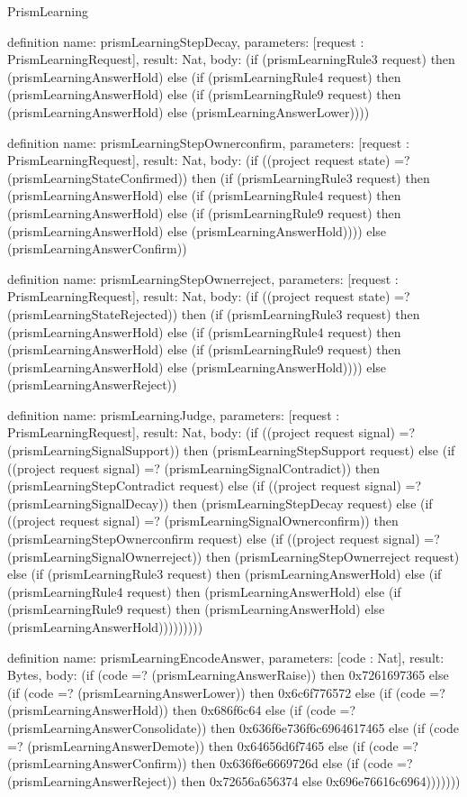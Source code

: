 \begin{lexlean}{PrismLearning}
\begin{semanticmodule}
definition{
  name: prismLearningStepDecay,
  parameters: [request : PrismLearningRequest],
  result: Nat,
  body: (if (prismLearningRule3 request) then (prismLearningAnswerHold) else (if (prismLearningRule4 request) then (prismLearningAnswerHold) else (if (prismLearningRule9 request) then (prismLearningAnswerHold) else (prismLearningAnswerLower))))
}

definition{
  name: prismLearningStepOwnerconfirm,
  parameters: [request : PrismLearningRequest],
  result: Nat,
  body: (if ((project request state) =? (prismLearningStateConfirmed)) then (if (prismLearningRule3 request) then (prismLearningAnswerHold) else (if (prismLearningRule4 request) then (prismLearningAnswerHold) else (if (prismLearningRule9 request) then (prismLearningAnswerHold) else (prismLearningAnswerHold)))) else (prismLearningAnswerConfirm))
}

definition{
  name: prismLearningStepOwnerreject,
  parameters: [request : PrismLearningRequest],
  result: Nat,
  body: (if ((project request state) =? (prismLearningStateRejected)) then (if (prismLearningRule3 request) then (prismLearningAnswerHold) else (if (prismLearningRule4 request) then (prismLearningAnswerHold) else (if (prismLearningRule9 request) then (prismLearningAnswerHold) else (prismLearningAnswerHold)))) else (prismLearningAnswerReject))
}

definition{
  name: prismLearningJudge,
  parameters: [request : PrismLearningRequest],
  result: Nat,
  body: (if ((project request signal) =? (prismLearningSignalSupport)) then (prismLearningStepSupport request) else (if ((project request signal) =? (prismLearningSignalContradict)) then (prismLearningStepContradict request) else (if ((project request signal) =? (prismLearningSignalDecay)) then (prismLearningStepDecay request) else (if ((project request signal) =? (prismLearningSignalOwnerconfirm)) then (prismLearningStepOwnerconfirm request) else (if ((project request signal) =? (prismLearningSignalOwnerreject)) then (prismLearningStepOwnerreject request) else (if (prismLearningRule3 request) then (prismLearningAnswerHold) else (if (prismLearningRule4 request) then (prismLearningAnswerHold) else (if (prismLearningRule9 request) then (prismLearningAnswerHold) else (prismLearningAnswerHold)))))))))
}

definition{
  name: prismLearningEncodeAnswer,
  parameters: [code : Nat],
  result: Bytes,
  body: (if (code =? (prismLearningAnswerRaise)) then 0x7261697365 else (if (code =? (prismLearningAnswerLower)) then 0x6c6f776572 else (if (code =? (prismLearningAnswerHold)) then 0x686f6c64 else (if (code =? (prismLearningAnswerConsolidate)) then 0x636f6e736f6c6964617465 else (if (code =? (prismLearningAnswerDemote)) then 0x64656d6f7465 else (if (code =? (prismLearningAnswerConfirm)) then 0x636f6e6669726d else (if (code =? (prismLearningAnswerReject)) then 0x72656a656374 else 0x696e76616c6964)))))))
}


\end{semanticmodule}
\end{lexlean}

